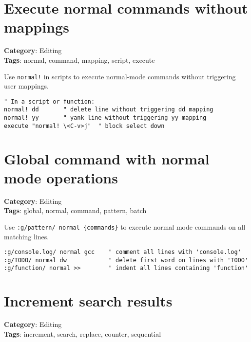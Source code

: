 {{{{{\section{Execute normal commands without mappings}

\textbf{Category}: Editing\\ \textbf{Tags}: normal, command, mapping, script, execute
\vspace{0.5cm}

Use {\footnotesize \Verb§normal!§} in scripts to execute normal-mode commands without triggering user mappings.

\begin{Exa*}{}
\begin{Verbatim}[fontsize=\footnotesize, breaklines, breakanywhere]
" In a script or function:
normal! dd       " delete line without triggering dd mapping
normal! yy       " yank line without triggering yy mapping
execute "normal! \<C-v>j"  " block select down
\end{Verbatim}
\end{Exa*}

\section{Global command with normal mode operations}

\textbf{Category}: Editing\\ \textbf{Tags}: global, normal, command, pattern, batch
\vspace{0.5cm}

Use {\footnotesize \Verb§:g/pattern/ normal {commands}§} to execute normal mode commands on all matching lines.

\begin{Exa*}{}
\begin{Verbatim}[fontsize=\footnotesize, breaklines, breakanywhere]
:g/console.log/ normal gcc    " comment all lines with 'console.log'
:g/TODO/ normal dw            " delete first word on lines with 'TODO'
:g/function/ normal >>        " indent all lines containing 'function'
\end{Verbatim}
\end{Exa*}

\section{Increment search results}

\textbf{Category}: Editing\\ \textbf{Tags}: increment, search, replace, counter, sequential
\vspace{0.5cm}

}}}}}
